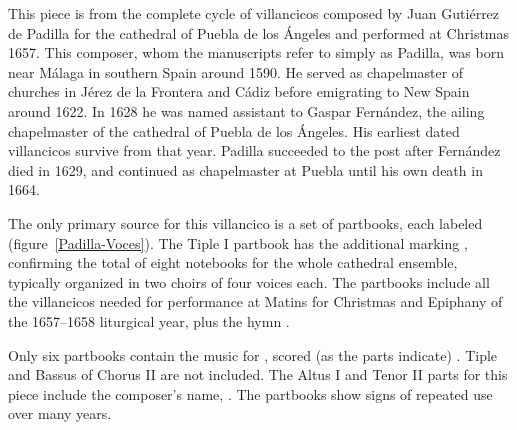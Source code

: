 
\begin{notesources}

    \begin{source}
    \end{source}

    \begin{source}
    \end{source}

\end{notesources}

This piece is from the complete cycle of villancicos composed by Juan Gutiérrez 
de Padilla for the cathedral of Puebla de los Ángeles and performed at 
Christmas 1657.%
    \Autocite[133--226]{Cashner:PhD}
This composer, whom the manuscripts refer to simply as Padilla, was born near
Málaga in southern Spain around 1590.%
    \Autocites{Mauleon:PadillaPalafox}{Hurtado:Padilla}{Stevenson:Padilla}
He served as chapelmaster of churches in Jérez de la Frontera and Cádiz before
emigrating to New Spain around 1622.
In 1628 he was named assistant to Gaspar Fernández, the ailing chapelmaster of
the cathedral of Puebla de los Ángeles.
His earliest dated villancicos survive from that year.%
    \Autocite{Cashner:Cards}
Padilla succeeded to the post after Fernández died in 1629, and continued as
chapelmaster at Puebla until his own death in 1664.

The only primary source for this villancico is a set of partbooks, each labeled
 (figure~\ref{Padilla-Voces}).
  \Autocites{Puebla:Microfilm}{Stanford:Catalog}
The Tiple I partbook has the additional marking , 
confirming the total of eight notebooks for the whole cathedral ensemble, 
typically organized in two choirs of four voices each.
The partbooks include all the villancicos needed for performance at Matins for 
Christmas and Epiphany of the 1657--1658 liturgical year, plus the hymn 
.

Only six partbooks contain the music for , 
scored (as the parts indicate) .
Tiple and Bassus of Chorus II are not included.
The Altus I and Tenor II parts for this piece include the composer's name, 
.
The partbooks show signs of repeated use over many years.

